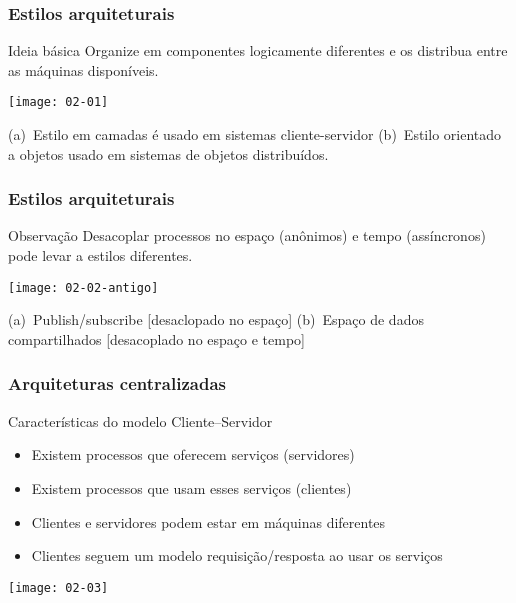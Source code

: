 \documentclass[Ligatures=TeX,table,brazil,svgnames,usetotalslideindicator,compress,10pt]{beamer}
\begin{document}
\begin{frame}
  \frametitle{Estilos arquiteturais}
  \begin{block}{Ideia básica}
    Organize em componentes \alert{logicamente diferentes} e os distribua entre as máquinas disponíveis.
  \end{block}

  \texttt{[image: 02-01]}

  (a)~Estilo em camadas é usado em sistemas cliente-servidor \newline
  (b)~Estilo orientado a objetos usado em sistemas de objetos distribuídos.

\end{frame}

\begin{frame}
  \frametitle{Estilos arquiteturais}
  \begin{block}{Observação}
    Desacoplar processos no \alert{espaço} (anônimos) e \alert{tempo} (assíncronos) pode levar a estilos diferentes.
  \end{block}

  \texttt{[image: 02-02-antigo]}

  (a)~Publish/subscribe [desaclopado no \alert{espaço}] \newline
  (b)~Espaço de dados compartilhados [desacoplado no \alert{espaço} e \alert{tempo}]

\end{frame}

\begin{frame}
  \frametitle{Arquiteturas centralizadas}
  \begin{block}{Características do modelo Cliente--Servidor}
    \begin{itemize}
    \item Existem processos que oferecem serviços (\alert{servidores})
    \item Existem processos que usam esses serviços (\alert{clientes})
    \item Clientes e servidores podem estar em máquinas diferentes
    \item Clientes seguem um modelo requisição/resposta ao usar os serviços
    \end{itemize}
  \end{block}

  \begin{center}
    \texttt{[image: 02-03]}
  \end{center}

\end{frame}
\end{document}
